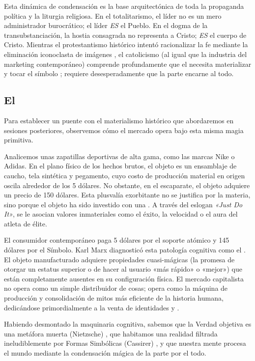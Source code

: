 Esta dinámica de condensación es la base arquitectónica de toda la propaganda política y la liturgia religiosa. En el totalitarismo, el líder no es un mero administrador burocrático; el líder \textit{ES} el Pueblo. En el dogma de la transubstanciación, la hostia consagrada no representa a Cristo; \textit{ES} el cuerpo de Cristo. Mientras el protestantismo histórico intentó racionalizar la fe mediante la eliminación iconoclasta de imágenes , el catolicismo (al igual que la industria del marketing contemporáneo) comprende profundamente que el \AnimalSimbolico{} necesita materializar y tocar el símbolo ; requiere desesperadamente que la parte encarne al todo.

\subsection{El \FetichismoMercancia}

Para establecer un puente con el materialismo histórico que abordaremos en sesiones posteriores, observemos cómo el mercado opera bajo esta misma magia primitiva. 

Analicemos unas zapatillas deportivas de alta gama, como las marcas Nike o Adidas. En el plano físico de los hechos brutos, el objeto es un ensamblaje de caucho, tela sintética y pegamento, cuyo costo de producción material en origen oscila alrededor de los 5 dólares. No obstante, en el escaparate, el objeto adquiere un precio de 150 dólares. Esta plusvalía exorbitante no se justifica por la materia, sino porque el objeto ha sido investido con una \FormaSimbolica{}. A través del eslogan \textit{«Just Do It»}, se le asocian valores inmateriales como el éxito, la velocidad o el aura del atleta de élite. 

El consumidor contemporáneo paga 5 dólares por el soporte atómico y 145 dólares por el Símbolo. Karl Marx diagnosticó esta patología cognitiva como el \textbf{\FetichismoMercancia}. El objeto manufacturado adquiere propiedades cuasi-mágicas (la promesa de otorgar un estatus superior o de hacer al usuario «más rápido» o «mejor») que están completamente ausentes en su configuración física. El mercado capitalista no opera como un simple distribuidor de cosas; opera como la máquina de producción y consolidación de mitos más eficiente de la historia humana, dedicándose primordialmente a la venta de identidades y \FormasSimbolicas{}.

Habiendo desmontado la maquinaria cognitiva, sabemos que la Verdad objetiva es una metáfora muerta (Nietzsche) , que habitamos una realidad filtrada ineludiblemente por Formas Simbólicas (Cassirer) , y que nuestra mente procesa el mundo mediante la condensación mágica de la parte por el todo. 

